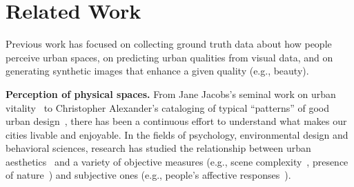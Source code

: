 \section{Related Work}
\label{sec:related}
Previous work has focused on collecting ground truth data about how people perceive urban spaces, on predicting urban qualities from visual data, and on generating synthetic images that enhance a given quality (e.g., beauty). 

\vspace{4pt}\noindent
\textbf{Perception of physical spaces.} From Jane Jacobs's seminal work on urban vitality~\cite{jacobs1961death} to Christopher Alexander's cataloging of typical ``patterns'' of good urban design~\cite{alexander1977pattern}, there has been a continuous effort to understand what makes our cities livable and enjoyable.  In the fields of psychology, environmental design and behavioral sciences, research has studied the relationship between urban aesthetics~\cite{real2000classification} and a variety of objective measures  (e.g.,  scene complexity~\cite{kaplan1972rated}, presence of nature~\cite{kaplan1989experience}) and subjective ones (e.g., people's affective responses~\cite{ulrich1983aesthetic}).  


